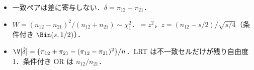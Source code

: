 \begin{summarybox}
\begin{itemize}
\item 一致ペアは差に寄与しない．$\delta=\pi_{12}-\pi_{21}$．
\item $W=(n_{12}-n_{21})^2/(n_{12}+n_{21})\sim\chi^2_1$．$=z^2$，$z=(n_{12}-s/2)/\sqrt{s/4}$（条件付き $\Bin(s,1/2)$）．
\item $\V[\hat\delta]=\{\pi_{12}+\pi_{21}-(\pi_{12}-\pi_{21})^2\}/n$．LRT は不一致セルだけが残り自由度1．条件付き OR は $n_{12}/n_{21}$．
\end{itemize}
\end{summarybox}
